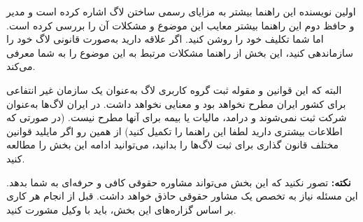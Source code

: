 
اولین نویسنده این راهنما بیشتر به مزایای رسمی ساختن لاگ اشاره کرده است
و مدیر و حافظ دوم این راهنما بیشتر معایب این موضوع و مشکلات آن را
بررسی کرده است. اما شما تکلیف خود را روشن کنید. اگر علاقه دارید به‌صورت
قانونی لاگ خود را سازماندهی کنید، این بخش از راهنما مشکلات مرتبط به
این موضوع را به شما معرفی می‌کند.

البته که این قوانین و مقوله ثبت گروه کاربری لاگ به‌عنوان یک سازمان غیر انتفاعی
برای کشور ایران مطرح نخواهد بود و معنایی نخواهد داشت. در ایران لاگ‌ها به‌عنوان شرکت
ثبت نمی‌شوند و درامد، مالیات یا بیمه برای آنها مطرح نیست.
(در صورتی که اطلاعات بیشتری دارید لطفا این راهنما را تکمیل کنید)
از همین رو اگر مایلید قوانین مختلف قانون گذاری برای ثبت لاگ‌ها را بدانید، می‌توانید
ادامه این بخش را مطالعه کنید.

{\bfseries نکته:}
تصور نکنید که این بخش می‌تواند مشاوره حقوقی کافی و حرفه‌ای به شما بدهد.
این مسئله نیاز به تخصص یک مشاور حقوقی حاذق خواهد داشت. قبل از انجام هر کاری
بر اساس گزاره‌های این بخش، باید با وکیل مشورت کنید.

